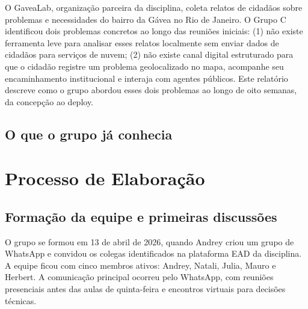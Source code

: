 \documentclass[12pt,a4paper]{article}
\begin{document}
O GaveaLab, organização parceira da disciplina, coleta relatos de cidadãos sobre
problemas e necessidades do bairro da Gávea no Rio de Janeiro. O Grupo C identificou
dois problemas concretos ao longo das reuniões iniciais: (1) não existe ferramenta leve
para analisar esses relatos localmente sem enviar dados de cidadãos para serviços de
nuvem; (2) não existe canal digital estruturado para que o cidadão registre um problema
geolocalizado no mapa, acompanhe seu encaminhamento institucional e interaja com
agentes públicos. Este relatório descreve como o grupo abordou esses dois problemas ao
longo de oito semanas, da concepção ao deploy.

\subsection{O que o grupo já conhecia}






\section{Processo de Elaboração}

\subsection{Formação da equipe e primeiras discussões}

O grupo se formou em 13 de abril de 2026, quando Andrey criou um grupo de WhatsApp e
convidou os colegas identificados na plataforma EAD da disciplina. A equipe ficou com
cinco membros ativos: Andrey, Natali, Julia, Mauro e Herbert. A comunicação principal
ocorreu pelo WhatsApp, com reuniões presenciais antes das aulas de quinta-feira e
encontros virtuais para decisões técnicas.
\end{document}
